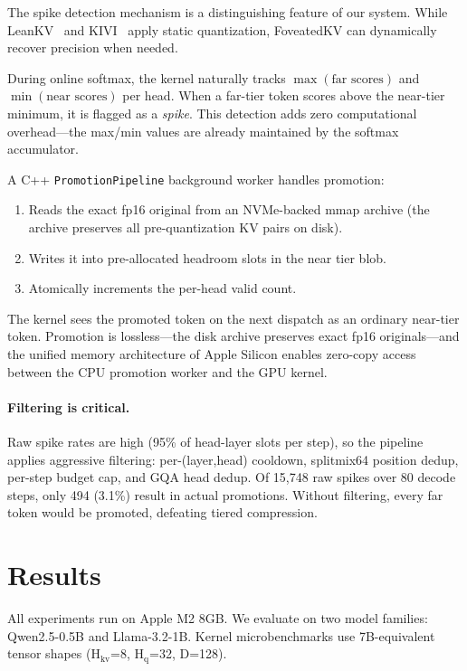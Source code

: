 \documentclass{article}
\begin{document}
The spike detection mechanism is a distinguishing feature of our system.
While LeanKV~\cite{leankv} and KIVI~\cite{kivi} apply static
quantization, FoveatedKV can dynamically recover precision when needed.

During online softmax, the kernel naturally tracks $\max(\text{far
scores})$ and $\min(\text{near scores})$ per head. When a far-tier token
scores above the near-tier minimum, it is flagged as a \emph{spike}.
This detection adds zero computational overhead---the max/min values are
already maintained by the softmax accumulator.

A C++ \texttt{PromotionPipeline} background worker handles promotion:

\begin{enumerate}
\item Reads the exact fp16 original from an NVMe-backed mmap archive
  (the archive preserves all pre-quantization KV pairs on disk).
\item Writes it into pre-allocated headroom slots in the near tier blob.
\item Atomically increments the per-head valid count.
\end{enumerate}

The kernel sees the promoted token on the next dispatch as an ordinary
near-tier token. Promotion is lossless---the disk archive preserves
exact fp16 originals---and the unified memory architecture of Apple
Silicon enables zero-copy access between the CPU promotion worker and
the GPU kernel.

\paragraph{Filtering is critical.}
Raw spike rates are high (95\% of head-layer slots per step), so the
pipeline applies aggressive filtering: per-(layer,head) cooldown,
splitmix64 position dedup, per-step budget cap, and GQA head dedup.
Of 15,748 raw spikes over 80 decode steps, only 494 (3.1\%) result in
actual promotions. Without filtering, every far token would be promoted,
defeating tiered compression.

\section{Results}

All experiments run on Apple M2 8GB. We evaluate on two model families:
Qwen2.5-0.5B and Llama-3.2-1B. Kernel microbenchmarks use 7B-equivalent
tensor shapes (H$_\text{kv}$=8, H$_\text{q}$=32, D=128).
\end{document}
